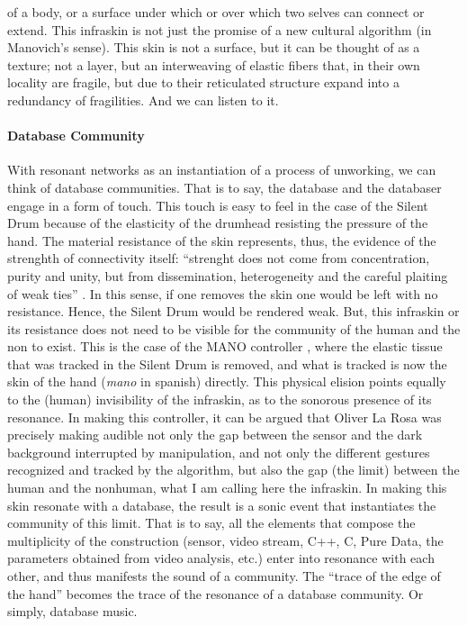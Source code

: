 of a body, or a surface under which or over which two selves can connect or extend. This infraskin is not just the promise of a new cultural algorithm (in Manovich's sense). This skin is not a surface, but it can be thought of as a texture; not a layer, but an interweaving of elastic fibers  that, in their own locality are fragile, but due to their reticulated structure expand into a redundancy of fragilities. And we can listen to it.  

\paragraph{Database Community}
With resonant networks as an instantiation of a process of unworking, we can think of database communities. That is to say, the database and the databaser engage in a form of touch. This touch is easy to feel in the case of the Silent Drum because of the elasticity of the drumhead resisting the pressure of the hand. The material resistance of the skin represents, thus, the evidence of the strenghth of connectivity itself: ``strenght does not come from concentration, purity and unity, but from dissemination, heterogeneity and the careful plaiting of weak ties'' \parencite[3]{Lat90:On}. In this sense, if one removes the skin one would be left with no resistance. Hence, the Silent Drum would be rendered weak. But, this infraskin or its resistance does not need to be visible for the community of the human and the non to exist. This is the case of the MANO controller \parencite{DBLP:conf/icmc/OliverJ10}, where the elastic tissue that was tracked in the Silent Drum is removed, and what is tracked is now the skin of the hand (\textit{mano} in spanish) directly. This physical elision points equally to the (human) invisibility of the infraskin, as to the sonorous presence of its resonance. In making this controller, it can be argued that Oliver La Rosa was precisely making audible not only the gap between the sensor and the dark background interrupted by manipulation, and not only the different gestures recognized and tracked by the algorithm, but also the gap (the limit) between the human and the nonhuman, what I am calling here the infraskin. In making this skin resonate with a database, the result is a sonic event that instantiates the community of this limit. That is to say, all the elements that compose the multiplicity of the construction (sensor, video stream, C++, C, Pure Data, the parameters obtained from video analysis, etc.) enter into resonance with each other, and thus manifests the sound of a community. The ``trace of the edge of the hand'' \parencite[2]{DBLP:conf/icmc/OliverJ10} becomes the trace of the resonance of a database community. Or simply, database music.

